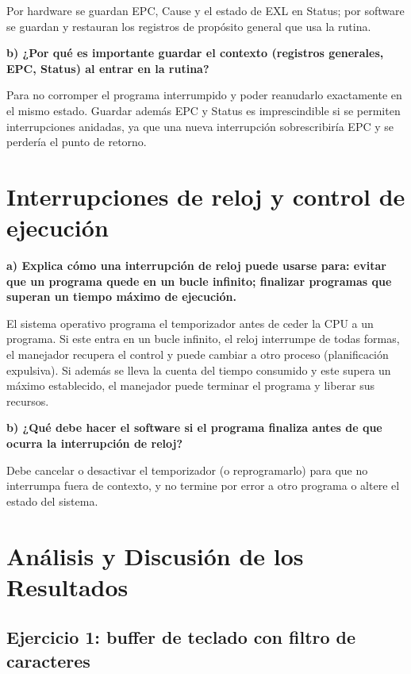 \documentclass[11pt,a4paper]{article}
\begin{document}
Por hardware se guardan EPC, Cause y el estado de EXL en Status; por software se guardan y restauran los registros de propósito general que usa la rutina.

\medskip
\noindent\textbf{b) ¿Por qué es importante guardar el contexto (registros generales, EPC, Status) al entrar en la rutina?}

\medskip
\noindent Para no corromper el programa interrumpido y poder reanudarlo exactamente en el mismo estado. Guardar además EPC y Status es imprescindible si se permiten interrupciones anidadas, ya que una nueva interrupción sobrescribiría EPC y se perdería el punto de retorno.

\section{Interrupciones de reloj y control de ejecución}

\noindent\textbf{a) Explica cómo una interrupción de reloj puede usarse para: evitar que un programa quede en un bucle infinito; finalizar programas que superan un tiempo máximo de ejecución.}

\medskip
\noindent El sistema operativo programa el temporizador antes de ceder la CPU a un programa. Si este entra en un bucle infinito, el reloj interrumpe de todas formas, el manejador recupera el control y puede cambiar a otro proceso (planificación expulsiva). Si además se lleva la cuenta del tiempo consumido y este supera un máximo establecido, el manejador puede terminar el programa y liberar sus recursos.

\medskip
\noindent\textbf{b) ¿Qué debe hacer el software si el programa finaliza antes de que ocurra la interrupción de reloj?}

\medskip
\noindent Debe cancelar o desactivar el temporizador (o reprogramarlo) para que no interrumpa fuera de contexto, y no termine por error a otro programa o altere el estado del sistema.

\section{Análisis y Discusión de los Resultados}

\subsection*{Ejercicio 1: buffer de teclado con filtro de caracteres}
\end{document}

